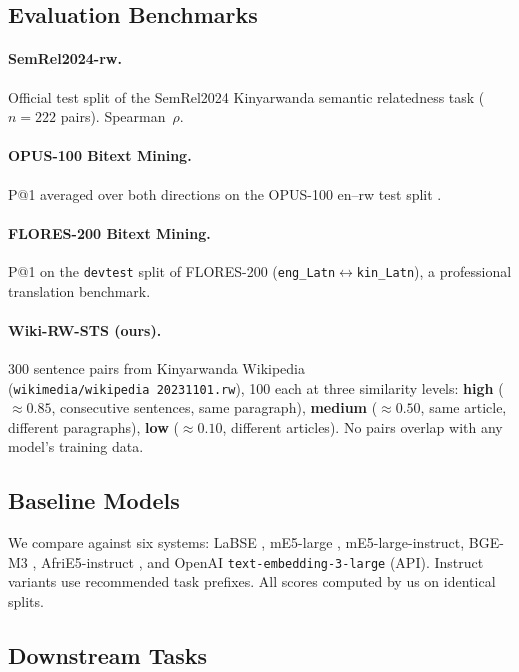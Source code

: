 \documentclass[letterpaper]{article} %
\begin{document}
\subsection{Evaluation Benchmarks}

\paragraph{SemRel2024-rw.}
Official test split of the SemRel2024 Kinyarwanda semantic relatedness task
\cite{ousidhoum-etal-2024-semrel2024} ($n = 222$ pairs). Spearman~$\rho$.

\paragraph{OPUS-100 Bitext Mining.}
P@1 averaged over both directions on the OPUS-100 en--rw test split
\cite{zhang-etal-2020-improving}.

\paragraph{FLORES-200 Bitext Mining.}
P@1 on the \texttt{devtest} split of FLORES-200 \cite{goyal-etal-2022-flores}
(\texttt{eng\_Latn}$\leftrightarrow$\texttt{kin\_Latn}), a professional
translation benchmark.

\paragraph{Wiki-RW-STS (ours).}
300 sentence pairs from Kinyarwanda Wikipedia
(\texttt{wikimedia/wikipedia~20231101.rw}), 100 each at three similarity levels:
\textbf{high} (${\approx}0.85$, consecutive sentences, same paragraph),
\textbf{medium} (${\approx}0.50$, same article, different paragraphs),
\textbf{low} (${\approx}0.10$, different articles). No pairs overlap with any
model's training data.

\subsection{Baseline Models}

We compare against six systems: LaBSE \cite{feng-etal-2022-language},
mE5-large \cite{wang2024multilingual}, mE5-large-instruct, BGE-M3
\cite{chen2024bge}, AfriE5-instruct \cite{zhang-etal-2024-afrie5}, and
OpenAI \texttt{text-embedding-3-large} (API). Instruct variants use
recommended task prefixes. All scores computed by us on identical splits.

\subsection{Downstream Tasks}
\end{document}
